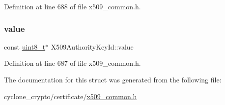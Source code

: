 Definition at line 688 of file x509\+\_\+common.\+h.

\mbox{\label{structX509AuthorityKeyId_a8d58117612a6a39683f7dac0454d41bb}} 
\subsubsection{\texorpdfstring{value}{value}}
{\footnotesize\ttfamily const \hyperlink{stdint_8h_aba7bc1797add20fe3efdf37ced1182c5}{uint8\+\_\+t}$\ast$ X509\+Authority\+Key\+Id\+::value}



Definition at line 687 of file x509\+\_\+common.\+h.



The documentation for this struct was generated from the following file\+:\begin{DoxyCompactItemize}
\item 
cyclone\+\_\+crypto/certificate/\hyperlink{certificate_2x509__common_8h}{x509\+\_\+common.\+h}\end{DoxyCompactItemize}
